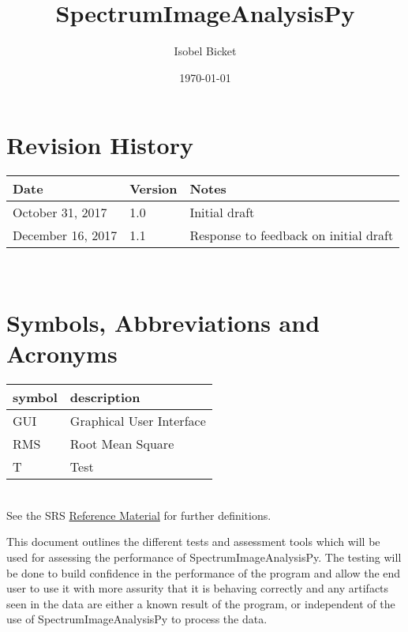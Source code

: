 \documentclass[12pt, titlepage]{article}
\newcommand{\progname}{SpectrumImageAnalysisPy}
\begin{document}

\title{SpectrumImageAnalysisPy} 
\author{Isobel Bicket}
\date{\today}
	
\maketitle


\section{Revision History}

\begin{tabularx}{\textwidth}{p{4cm}p{2cm}X}
\toprule {\bf Date} & {\bf Version} & {\bf Notes}\\
\midrule
October 31, 2017 & 1.0 & Initial draft\\
December 16, 2017 & 1.1 & Response to feedback on initial draft\\
\bottomrule
\end{tabularx}

~\newpage

\section{Symbols, Abbreviations and Acronyms}

\renewcommand{\arraystretch}{1.2}
\begin{tabular}{l l} 
  \toprule		
  \textbf{symbol} & \textbf{description}\\
  \midrule 
  GUI & Graphical User Interface\\
  RMS & Root Mean Square\\
  T & Test\\
  \bottomrule
\end{tabular}\\

See the SRS \hyperref[SRS:RefMat]{Reference Material} for further definitions. 

\newpage

\tableofcontents

\listoftables

\newpage


This document outlines the different tests and assessment tools which will be
used for assessing the performance of \progname{}. The testing will be done to
build confidence in the performance of the program and allow the end user to use
it with more assurity that it is behaving correctly and any artifacts seen in
the data are either a known result of the program, or independent of the use of
\progname{} to process the data.
\end{document}
